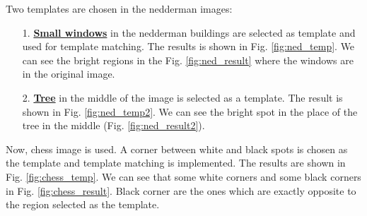 \documentclass[12pt]{article}
\begin{document}
Two templates are chosen in the nedderman images:
\begin{itemize}
	\item[1.] \underline{ \textbf{Small windows}} in the nedderman buildings are selected as template and used for template matching. The results is shown in Fig. \ref{fig:ned_temp}. We can see the bright regions in the Fig. \ref{fig:ned_result} where the windows are in the original image.
	\item[2.] \underline{\textbf{Tree}} in the middle of the image is selected as a template. The result is shown in Fig. \ref{fig:ned_temp2}. We can see the bright spot in the place of the tree in the middle (Fig. \ref{fig:ned_result2}).

\end{itemize}
Now, chess image is used. A corner between white and black spots is chosen as the template and template matching is implemented. The results are shown in Fig. \ref{fig:chess_temp}. We can see that some white corners and some black corners in Fig. \ref{fig:chess_result}. Black corner are the ones which are exactly opposite to the region selected as the template.  
\end{document}
